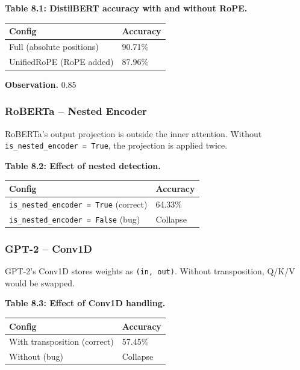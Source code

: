 \textbf{Table 8.1: DistilBERT accuracy with and without RoPE.}

\begin{table}[H]
\centering
\small
\begin{tabular}{ll}
\toprule
\textbf{Config} & \textbf{Accuracy} \\
\midrule
Full (absolute positions) & 90.71\% \\
UnifiedRoPE (RoPE added) & 87.96\% \\
\bottomrule
\end{tabular}
\end{table}

\textbf{Observation.} 0.85

\subsubsection{RoBERTa -- Nested Encoder}

RoBERTa's output projection is outside the inner attention. Without 
\texttt{is\_nested\_encoder = True}, the projection is applied twice.

\textbf{Table 8.2: Effect of nested detection.}

\begin{table}[H]
\centering
\small
\begin{tabular}{ll}
\toprule
\textbf{Config} & \textbf{Accuracy} \\
\midrule
\texttt{is\_nested\_encoder = True} (correct) & 64.33\% \\
\texttt{is\_nested\_encoder = False} (bug) & Collapse \\
\bottomrule
\end{tabular}
\end{table}

\subsubsection{GPT-2 -- Conv1D}

GPT-2's Conv1D stores weights as \texttt{(in, out)}. Without transposition, 
Q/K/V would be swapped.

\textbf{Table 8.3: Effect of Conv1D handling.}

\begin{table}[H]
\centering
\small
\begin{tabular}{ll}
\toprule
\textbf{Config} & \textbf{Accuracy} \\
\midrule
With transposition (correct) & 57.45\% \\
Without (bug) & Collapse \\
\bottomrule
\end{tabular}
\end{table}

